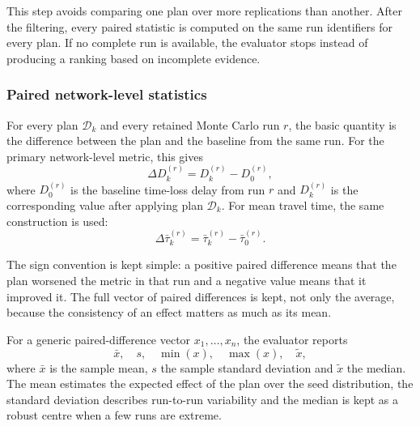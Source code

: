 This step avoids comparing one plan over more replications than another. After
the filtering, every paired statistic is computed on the same run identifiers
for every plan. If no complete run is available, the evaluator stops instead
of producing a ranking based on incomplete evidence.

\subsubsection{Paired network-level statistics}
\label{sssec:evaluator_paired_stats}

For every plan $\mathcal{D}_k$ and every retained Monte Carlo run $r$, the
basic quantity is the difference between the plan and the baseline from the
same run. For the primary network-level metric, this gives
\begin{equation}
  \Delta D_k^{(r)} = D_k^{(r)} - D_0^{(r)},
  \label{eq:evaluator_delta_delay}
\end{equation}
where $D_0^{(r)}$ is the baseline time-loss delay from run $r$ and
$D_k^{(r)}$ is the corresponding value after applying plan $\mathcal{D}_k$.
For mean travel time, the same construction is used:
\begin{equation}
  \Delta \bar{\tau}_k^{(r)}
  =
  \bar{\tau}_k^{(r)} - \bar{\tau}_0^{(r)}.
  \label{eq:evaluator_delta_travel_time}
\end{equation}

The sign convention is kept simple: a positive paired difference means that
the plan worsened the metric in that run and a negative value means that it
improved it. The full vector of paired differences is kept, not only the
average, because the consistency of an effect matters as much as its mean.

For a generic paired-difference vector
$x_1,\ldots,x_n$, the evaluator reports
\begin{equation}
  \bar{x},\quad s,\quad \min(x),\quad \max(x),\quad \tilde{x},
  \label{eq:evaluator_descriptive_stats}
\end{equation}
where $\bar{x}$ is the sample mean, $s$ the sample standard deviation and
$\tilde{x}$ the median. The mean estimates the expected effect of the plan
over the seed distribution, the standard deviation describes run-to-run
variability and the median is kept as a robust centre when a few runs are
extreme.

